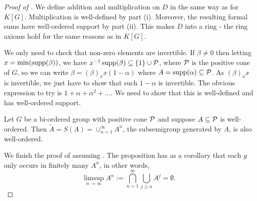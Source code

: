 \begin{proof}[Proof of ]
    We define addition and multiplication on $D$ in the same way as for $K[G]$.
    Multiplication is well-defined by  part (i).
    Moreover, the resulting formal sums have well-ordered support by part (ii).
    This makes $D$ into a ring - the ring axioms hold for the same reasons as in $K[G]$.

    We only need to check that non-zero elements are invertible.
    If $\beta \neq 0$ then letting $x = \min(\operatorname{supp}(\beta))$, we have $x^{-1} \operatorname{supp}(\beta) \subseteq \{1\} \cup \mathcal{P}$, where $\mathcal{P}$ is the positive cone of $G$, so we can write $\beta = (\beta)_x x (1 - \alpha)$ where $A = \operatorname{supp}(\alpha) \subseteq \mathcal{P}$.
    As $(\beta)_x x$ is invertible, we just have to show that such $1 - \alpha$ is invertible.
    The obvious expression to try is $1 + \alpha + \alpha^2 + \dots$.
    We need to show that this is well-defined and has well-ordered support.

    \begin{proposition}
        \label{proposition:wellordered_subsemigroup}
        Let $G$ be a bi-ordered group with positive cone $\mathcal{P}$ and suppose $A \subseteq \mathcal{P}$ is well-ordered.
        Then $\tilde{A} = S(A) = \cup_{n=1}^\infty A^n$, the subsemigroup generated by $A$, is also well-ordered.
    \end{proposition}

    We finish the proof of  assuming .
    The proposition has as a corollary that each $g$ only occurs in finitely many $A^n$, in other words, \[
        \limsup_{n \to \infty} A^n := \bigcap_{n=1}^\infty \bigcup_{j \geq n} A^j = \emptyset.
    \]


\end{proof}
